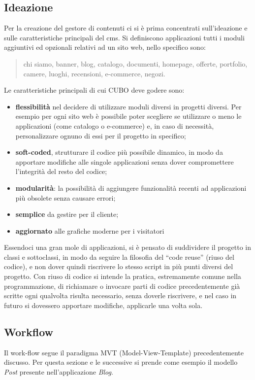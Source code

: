 \documentclass[12pt,a4paper]{article}
\begin{document}
\subsection{Ideazione}
Per la creazione del gestore di contenuti ci si è prima concentrati sull’ideazione e sulle caratteristiche principali del cms.
Si definiscono applicazioni tutti i moduli aggiuntivi ed opzionali relativi ad un sito web, nello specifico sono:
\begin{quote}
    chi siamo, banner, blog, catalogo, documenti, homepage, offerte, portfolio, camere, luoghi, recensioni, e-commerce, negozi.
\end{quote}
Le caratteristiche principali di cui CUBO deve godere sono:
\begin{itemize}
    \item \textbf{flessibilità} nel decidere di utilizzare moduli diversi in progetti diversi. Per esempio per ogni sito web è possibile poter scegliere se utilizzare o meno le applicazioni (come catalogo o e-commerce) e, in caso di necessità, personalizzare ognuno di essi per il progetto in specifico;
    \item \textbf{soft-coded}, strutturare il codice più possibile dinamico, in modo da apportare modifiche alle singole applicazioni senza dover compromettere l’integrità del resto del codice;
    \item \textbf{modularità}: la possibilità di aggiungere funzionalità recenti ad applicazioni più obsolete senza causare errori;
    \item \textbf{semplice} da gestire per il cliente;
    \item \textbf{aggiornato} alle grafiche moderne per i visitatori
\end{itemize}
Essendoci una gran mole di applicazioni, si è pensato di suddividere il progetto in classi e sottoclassi, in modo da seguire la filosofia del “code reuse” (riuso del codice), e non dover quindi riscrivere lo stesso script in più punti diversi del progetto.
Con riuso di codice si intende la pratica, estremamente comune nella programmazione, di richiamare o invocare parti di codice precedentemente già scritte ogni qualvolta risulta necessario, senza doverle riscrivere, e nel caso in futuro si dovessero apportare modifiche, applicarle una volta sola.

\subsection{Workflow}
Il work-flow segue il paradigma MVT (Model-View-Template) precedentemente discusso.
Per questa sezione e le successive si prende come esempio il modello \textit{Post} presente nell’applicazione \textit{Blog}.
\end{document}
